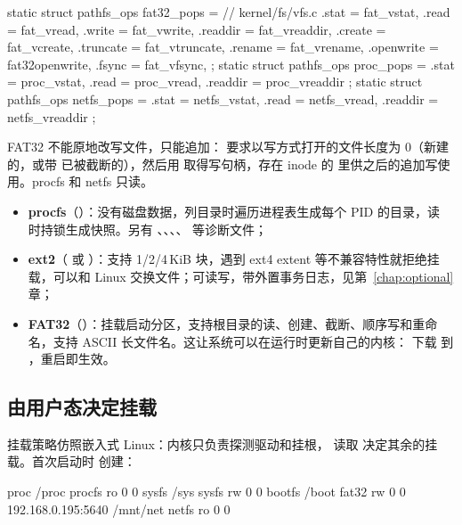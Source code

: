 \begin{ccode}
static struct pathfs_ops fat32_pops = {      // kernel/fs/vfs.c
  .stat = fat_vstat, .read = fat_vread, .write = fat_vwrite,
  .readdir = fat_vreaddir, .create = fat_vcreate, .truncate = fat_vtruncate,
  .rename = fat_vrename, .openwrite = fat32openwrite, .fsync = fat_vfsync,
};
static struct pathfs_ops proc_pops  = { .stat = proc_vstat,  .read = proc_vread,  .readdir = proc_vreaddir };
static struct pathfs_ops netfs_pops = { .stat = netfs_vstat, .read = netfs_vread, .readdir = netfs_vreaddir };
\end{ccode}

FAT32 不能原地改写文件，只能追加： 要求以写方式打开的文件长度为 0（新建的，或带  已被截断的），然后用  取得写句柄，存在 inode 的  里供之后的追加写使用。procfs 和 netfs 只读。

\begin{itemize}
  \item \textbf{procfs}（）：没有磁盘数据，列目录时遍历进程表生成每个 PID 的目录，读  时持锁生成快照。另有 、、、、 等诊断文件；
  \item \textbf{ext2}（ 或 \code{/}）：支持 1/2/4\,KiB 块，遇到 ext4 extent 等不兼容特性就拒绝挂载，可以和 Linux 交换文件；可读写，带外置事务日志，见第~\ref{chap:optional} 章；
  \item \textbf{FAT32}（）：挂载启动分区，支持根目录的读、创建、截断、顺序写和重命名，支持 ASCII 长文件名。这让系统可以在运行时更新自己的内核： 下载  到 ，重启即生效。
\end{itemize}

\subsection{由用户态决定挂载}

挂载策略仿照嵌入式 Linux：内核只负责探测驱动和挂根， 读取  决定其余的挂载。首次启动时  创建：

\begin{txtcode}
proc                /proc     procfs ro 0 0
sysfs               /sys      sysfs  rw 0 0
bootfs              /boot     fat32  rw 0 0
192.168.0.195:5640  /mnt/net  netfs  ro 0 0
\end{txtcode}


